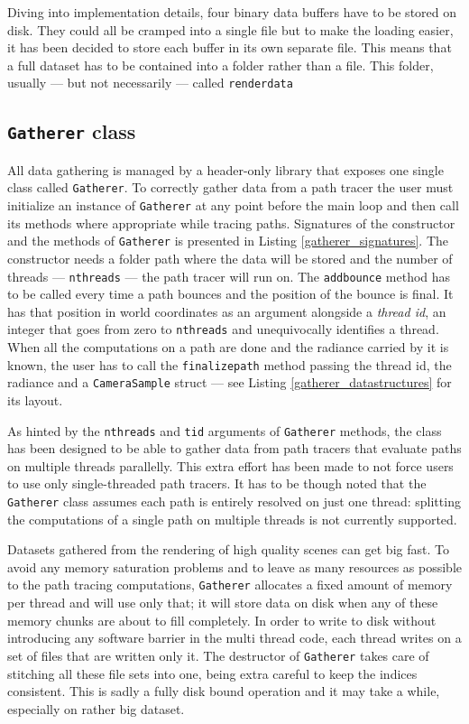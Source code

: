 Diving into implementation details, four binary data buffers have to be stored on disk. They could all be cramped into a single file but to make the loading easier, it has been decided to store each buffer in its own separate file. This means that a full dataset has to be contained into a folder rather than a file. This folder, usually --- but not necessarily --- called \texttt{renderdata}

\subsection{\texttt{Gatherer} class}
All data gathering is managed by a header-only library that exposes one single class called \texttt{Gatherer}. To correctly gather data from a path tracer the user must initialize an instance of \texttt{Gatherer} at any point before the main loop and then call its methods where appropriate while tracing paths. Signatures of the constructor and the methods of \texttt{Gatherer} is presented in Listing \ref{gatherer_signatures}.
The constructor needs a folder path where the data will be stored and the number of threads --- \texttt{nthreads} --- the path tracer will run on. The \texttt{addbounce} method has to be called every time a path bounces and the position of the bounce is final. It has that position in world coordinates as an argument  alongside a \textit{thread id}, an integer that goes from zero to \texttt{nthreads} and unequivocally identifies a thread.
When all the computations on a path are done and the radiance carried by it is known, the user has to call the \texttt{finalizepath} method passing the thread id, the radiance and a \texttt{CameraSample} struct --- see Listing \ref{gatherer_datastructures} for its layout.

As hinted by the \texttt{nthreads} and \texttt{tid} arguments of \texttt{Gatherer} methods, the class has been designed to be able to gather data from path tracers that evaluate paths on multiple threads parallelly. This extra effort has been made to not force users to use only single-threaded path tracers. It has to be though noted that the \texttt{Gatherer} class assumes each path is entirely resolved on just one thread: splitting the computations of a single path on multiple threads is not currently supported.

Datasets gathered from the rendering of high quality scenes can get big fast. To avoid any memory saturation problems and to leave as many resources as possible to the path tracing computations, \texttt{Gatherer} allocates a fixed amount of memory per thread and will use only that; it will store data on disk when any of these memory chunks are about to fill completely. In order to write to disk without introducing any software barrier in the multi thread code, each thread writes on a set of files that are written only it. The destructor of \texttt{Gatherer} takes care of stitching all these file sets into one, being extra careful to keep the indices consistent. This is sadly a fully disk bound operation and it may take a while, especially on rather big dataset.



